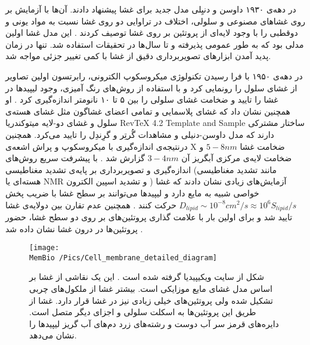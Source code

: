 در دهه‌ی ۱۹۳۰ داوسن
و دنیِلی
مدل جدید برای غشا پیشنهاد دادند. آن‌ها با آزمایش بر روی غشا‌های مصنوعی و سلولی، اختلاف در تراوایی دو روی غشا نسبت به مواد یونی و دوقطبی را با وجود لایه‌ای از پروتئین بر روی غشا توصیف کردند
\cite{Danielli1935}. 
این مدل غشا اولین مدلی بود که به طور عمومی پذیرفته  و تا سال‌ها  در تحقیقات استفاده شد. تنها در زمان پدید آمدن ابزار‌های تصویر‌برداری دقیق از غشا با کمی تغییر جزئی مواجه شد.

در دهه‌ی ۱۹۵۰ با فرا رسیدن تکنولوژی میکروسکوپ الکترونی، رابرتسون
 اولین تصاویر از غشای سلول را رونمایی کرد و با استفاده از روش‌های رنگ آمیزی، وجود لیپید‌ها
 در غشا را تایید و ضخامت غشای سلولی را بین ۵ تا ۱۰ نانومتر اندازه‌گیری کرد
\cite{ROBERTSON1959aa}.
او همچنین نشان داد که غشای پلاسمایی و تمامی اعضای غشاگون مثل غشای هسته‌ی سلول و غشای دو-لایه میتوکندریا
RevTeX 4.2 Template and Sample
ساختار مشترکی دارند که مدل داوسن-دنیلی و مشاهدات گُرتِر و گرِندِل را تایید می‌کرد.
همچنین درنتیجه‌ی اندازه‌گیری با میکروسکوپ و پراش اشعه‌ی X ضخامت غشا 
 $5-8nm$
و ضخامت لایه‌ی مرکزی آبگریز آن
 $3-4nm$
گزارش شد
\cite{NelsonBook2004}.
با پیشرفت سریع روش‌های اندازه‌گیری و تصویربرداری بر پایه‌ی تشدید مغناطیسی (مانند تشدید مغناطیسی‌ هسته‌ای یا NMR
و تشدید اسپین الکترون
) آزمایش‌های زیادی نشان دادند که غشا  خواصی شبیه به مایع دارد
\cite{Edidin2003}
و لیپید‌ها می‌توانند بر سطح غشا با ضریب پخش
$D_{lipid}\sim 10^{-8}cm^2/s\approx 10^6S_{lipid}/s$
 حرکت کنند
\cite{NelsonBook2004,Chapman1975}.
همچنین عدم تقارن بین دولایه‌ی غشا تایید شد و برای اولین بار با علامت گذاری پروتئین‌های بر روی دو سطح غشا، حضور پروتئین‌ها در درون غشا نشان داده شد
\cite{Bretscher1973}.




\begin{figure}[h]
\begin{center}
\texttt{[image: \\MemBio /Pics/Cell\_membrane\_detailed\_diagram]}
\caption{
شکل از سایت ویکیپیدیا گرفته شده است
\cite{wikiCellMembrane}
. این یک نقاشی از غشا بر اساس مدل غشای مایع موزایکی است. بیشتر غشا از ملکول‌های چربی تشکیل شده ولی پروتئین‌های خیلی زیادی نیز در غشا قرار دارد.  غشا از طریق این پروتئین‌ها به اسکلت سلولی و اجزای دیگر متصل است. دایره‌های قرمز سر آب دوست و رشته‌های زرد دم‌های آب گریز لیپید‌ها را نشان می‌دهد.
}
\label{fig:fluidmembranemodel}
\end{center}
\end{figure}



